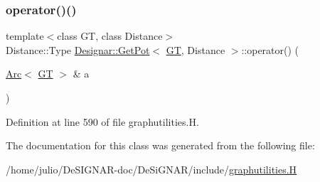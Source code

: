 \subsubsection{\texorpdfstring{operator()()}{operator()()}}
{\footnotesize\ttfamily template$<$class GT, class Distance$>$ \\
Distance\+::\+Type \hyperlink{class_designar_1_1_get_pot}{Designar\+::\+Get\+Pot}$<$ \hyperlink{demo-buildgraph_8_c_a3001c40d2c31ca87ed96cd7d1334a55e}{GT}, Distance $>$\+::operator() (\begin{DoxyParamCaption}\item[{\hyperlink{namespace_designar_a3f55fb5513d62ff47cbc8f72b8e95d6f}{Arc}$<$ \hyperlink{demo-buildgraph_8_c_a3001c40d2c31ca87ed96cd7d1334a55e}{GT} $>$ \&}]{a }\end{DoxyParamCaption})\hspace{0.3cm}{\ttfamily [inline]}}



Definition at line 590 of file graphutilities.\+H.



The documentation for this class was generated from the following file\+:\begin{DoxyCompactItemize}
\item 
/home/julio/\+De\+S\+I\+G\+N\+A\+R-\/doc/\+De\+Si\+G\+N\+A\+R/include/\hyperlink{graphutilities_8_h}{graphutilities.\+H}\end{DoxyCompactItemize}
